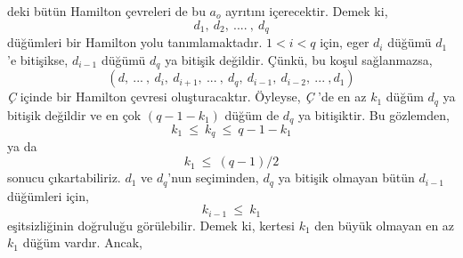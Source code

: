 \documentclass[11pt]{amsbook}
\begin{document}

deki bütün Hamilton çevreleri de bu $a_o$ ayrıtını içerecektir. Demek ki, 
\[ 
d_1, \: d_2, \: .... \: , \: d_q
\]
düğümleri bir Hamilton yolu tanımlamaktadır. $1 < i < q$ için, eger $d_i$ düğümü $d_1$'e bitişikse, 
$d_{i-1}$ düğümü $d_q$ ya bitişik değildir. Çünkü, bu koşul sağlanmazsa, 
\[
(d , \: ... \:, \: d_i, \: d_{i+1}, \: ... \: , \: d_q, \: d_{i-1}, \: d_{i-2}, \:... \: ,d_1)  
\]
\textit{Ç} içinde bir Hamilton çevresi oluşturacaktır. Öyleyse, \textit{Ç} 'de en az $k_1$ düğüm $d_q$ ya bitişik değildir ve en çok $(q-1-k_1)$ düğüm de $d_q$ ya bitişiktir. Bu gözlemden,
\[
k_1 \: \leq \: k_q \: \leq \: q-1-k_1
\]
ya da
\[
k_1 \: \leq \: (q-1)/2
\]
sonucu çıkartabiliriz. $d_1$ ve $d_q$'nun seçiminden, $d_q$ ya bitişik olmayan bütün $d_{i-1}$ düğümleri için,
\[
k_{i-1} \: \leq \: k_1
\]
eşitsizliğinin doğruluğu görülebilir. Demek ki, kertesi $k_1$ den büyük olmayan en az $k_1$ düğüm vardır. 
Ancak,
\end{document}
